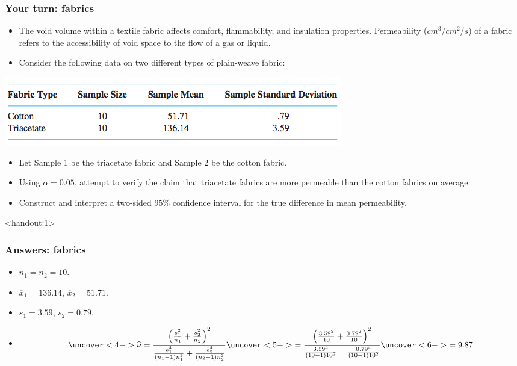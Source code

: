 \documentclass[handout]{beamer}\usepackage{graphicx, color}
\newcommand{\answers}{1}
\providecommand{\ov}[1]{\overline{#1}}
\providecommand{\wh}[1]{\widehat{#1}}
\numberwithin{equation}{section}
\begin{document}
\begin{frame}
\frametitle{Your turn: fabrics} \scriptsize
\begin{itemize}
\item The void volume within a textile fabric affects comfort, flammability, and insulation properties. Permeability ($cm^3/cm^2/s$) of a fabric refers to the accessibility of void space to the flow of a gas or liquid. 
\pause \item Consider the following data on two different types of plain-weave fabric:
\end{itemize}
 \includegraphics{../../fig/fabricdata.png}
\begin{itemize}
\pause \item Let Sample 1 be the triacetate fabric and Sample 2 be the cotton fabric.
\pause \item Using $\alpha = 0.05$, attempt to verify the claim that triacetate fabrics are more permeable than the cotton fabrics on average.
\pause \item Construct and interpret a two-sided 95\% confidence interval for the true difference in mean permeability.
\end{itemize}
\end{frame}



\begin{frame}<handout:\answers>
\frametitle{Answers: fabrics}
\begin{itemize}
\item $n_1 = n_2 = 10$.
\pause \item $\ov{x}_1 = 136.14$, $\ov{x}_2 = 51.71$.
\pause \item $s_1 = 3.59$, $s_2 = 0.79$.
\item
\begin{align*}
\uncover<4->{\wh{\nu} = \frac{\left (\frac{s_1^2}{n_1} + \frac{s_2^2}{n_2} \right )^2}{\frac{s_1^4}{(n_1 - 1)n_1^2} + \frac{s_2^4}{(n_2 - 1)n_2^2}}} \uncover<5->{ = \frac{\left (\frac{3.59^2}{10} + \frac{0.79^2}{10} \right )^2}{\frac{3.59^4}{(10 - 1)10^2} + \frac{0.79^4}{(10 - 1)10^2}}} \uncover<6->{ = 9.87}
\end{align*}
\end{itemize}
\end{frame}
\end{document}
